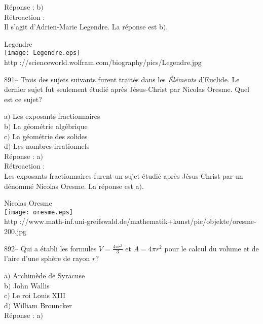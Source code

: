 ﻿\documentclass[letterpaper, 12pt]{article}
\begin{document}
R\'eponse : b$)$\\

R\'etroaction : \\
Il s'agit d'Adrien-Marie Legendre. La r\'eponse est b$)$.

        \begin{center}
        Legendre\\
    \texttt{[image: Legendre.eps]}\\
        {\footnotesize http
://scienceworld.wolfram.com/biography/pics/Legendre.jpg}
    \end{center}

891-- Trois des sujets suivants furent trait\'es dans les {\sl
\'El\'ements} d'Euclide. Le dernier sujet fut seulement \'etudi\'e
apr\`es J\'esus-Christ par Nicolas Oresme. Quel est ce sujet?

a$)$ Les exposants fractionnaires \\
b$)$ La g\'eom\'etrie alg\'ebrique \\
c$)$ La g\'eom\'etrie des solides \\
d$)$ Les nombres irrationnels\\

R\'eponse : a$)$\\

R\'etroaction : \\
Les exposants fractionnaires furent un sujet \'etudi\'e apr\`es
J\'esus-Christ par un d\'enomm\'e Nicolas Oresme. La r\'eponse est a$)$.\\

        \begin{center}
        Nicolas Oresme\\
    \texttt{[image: oresme.eps]}\\
        {\footnotesize http
://www.math-inf.uni-greifswald.de/mathematik+kunst/pic/objekte/oresme-200.jpg}
    \end{center}

892-- Qui a \'etabli les formules $V=\frac{4\pi r^3}3$ et $A=4\pi
r^2$ pour le calcul du volume et de l'aire d'une sph\`ere de rayon
$r$?

a$)$ Archim\`ede de Syracuse \\
b$)$ John Wallis \\
c$)$ Le roi Louis XIII \\
d$)$ William Brouncker\\

R\'eponse : a$)$\\
\end{document}
